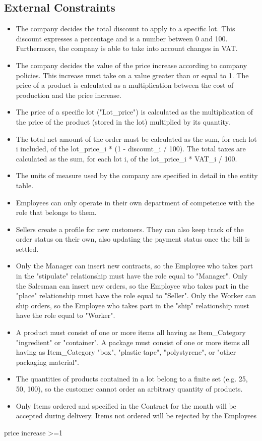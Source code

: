 \subsection{External Constraints}
\begin{itemize}
\item The company decides the total discount to apply to a specific lot. This discount expresses a percentage and is a number between 0 and 100. Furthermore, the company is able to take into account changes in VAT.
\item The company decides the value of the price increase according to company policies. This increase must take on a value greater than or equal to 1. The price of a product is calculated as a multiplication between the cost of production and the price increase.
\item The price of a specific lot ("Lot_price") is calculated as the multiplication of the price of the product (stored in the lot) multiplied by its quantity.
\item The total net amount of the order must be calculated as the sum, for each lot i included, of the lot\_price\_i * (1 - discount\_i / 100). The total taxes are calculated as the sum, for each lot i, of the lot\_price\_i * VAT\_i / 100.
\item The units of measure used by the company are specified in detail in the entity table.
\item Employees can only operate in their own department of competence with the role that belongs to them.
\item Sellers create a profile for new customers. They can also keep track of the order status on their own, also updating the payment status once the bill is settled.
\item Only the Manager can insert new contracts, so the Employee who takes part in the "stipulate" relationship must have the role equal to "Manager". Only the Salesman can insert new orders, so the Employee who takes part in the "place" relationship must have the role equal to "Seller". Only the Worker can ship orders, so the Employee who takes part in the "ship" relationship must have the role equal to "Worker".
\item A product must consist of one or more items all having as Item\_Category "ingredient" or "container". A package must consist of one or more items all having as Item\_Category "box", "plastic tape", "polystyrene", or "other packaging material". %
\item The quantities of products contained in a lot belong to a finite set (e.g. 25, 50, 100), so the customer cannot order an arbitrary quantity of products.
\item Only Items ordered and specified in the Contract for the month will be accepted during delivery. Items not ordered will be rejected by the Employees
\end{itemize}

price increase >=1